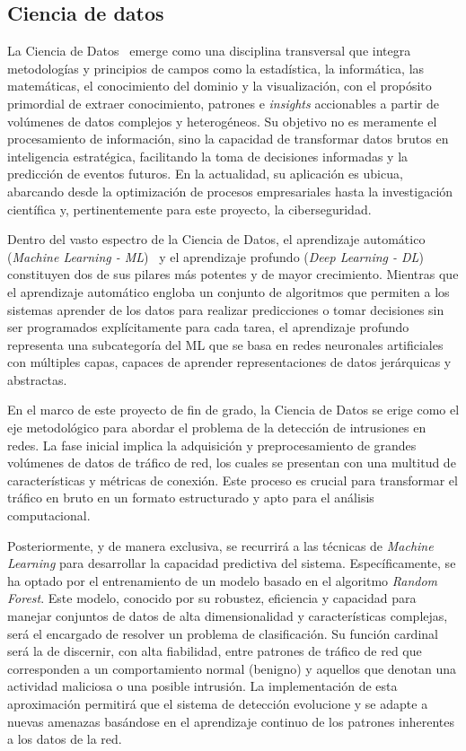 \subsection{Ciencia de datos}\label{Sec.Referencias}

La Ciencia de Datos~\cite{iadbCienciaDatos,ibmCienciaDatos} emerge como una disciplina transversal que integra metodologías y principios de campos como la estadística, la informática, las matemáticas, el conocimiento del dominio y la visualización, con el propósito primordial de extraer conocimiento, patrones e \textit{insights} accionables a partir de volúmenes de datos complejos y heterogéneos. Su objetivo no es meramente el procesamiento de información, sino la capacidad de transformar datos brutos en inteligencia estratégica, facilitando la toma de decisiones informadas y la predicción de eventos futuros. En la actualidad, su aplicación es ubicua, abarcando desde la optimización de procesos empresariales hasta la investigación científica y, pertinentemente para este proyecto, la ciberseguridad.

Dentro del vasto espectro de la Ciencia de Datos, el aprendizaje automático (\textit{Machine Learning - ML})~\cite{bishop2007prml} y el aprendizaje profundo (\textit{Deep Learning - DL}) constituyen dos de sus pilares más potentes y de mayor crecimiento. Mientras que el aprendizaje automático engloba un conjunto de algoritmos que permiten a los sistemas aprender de los datos para realizar predicciones o tomar decisiones sin ser programados explícitamente para cada tarea, el aprendizaje profundo representa una subcategoría del ML que se basa en redes neuronales artificiales con múltiples capas, capaces de aprender representaciones de datos jerárquicas y abstractas.

En el marco de este proyecto de fin de grado, la Ciencia de Datos se erige como el eje metodológico para abordar el problema de la detección de intrusiones en redes. La fase inicial implica la adquisición y preprocesamiento de grandes volúmenes de datos de tráfico de red, los cuales se presentan con una multitud de características y métricas de conexión. Este proceso es crucial para transformar el tráfico en bruto en un formato estructurado y apto para el análisis computacional.

Posteriormente, y de manera exclusiva, se recurrirá a las técnicas de \textit{Machine Learning} para desarrollar la capacidad predictiva del sistema. Específicamente, se ha optado por el entrenamiento de un modelo basado en el algoritmo \textit{Random Forest}. Este modelo, conocido por su robustez, eficiencia y capacidad para manejar conjuntos de datos de alta dimensionalidad y características complejas, será el encargado de resolver un problema de clasificación. Su función cardinal será la de discernir, con alta fiabilidad, entre patrones de tráfico de red que corresponden a un comportamiento normal (benigno) y aquellos que denotan una actividad maliciosa o una posible intrusión. La implementación de esta aproximación permitirá que el sistema de detección evolucione y se adapte a nuevas amenazas basándose en el aprendizaje continuo de los patrones inherentes a los datos de la red.

